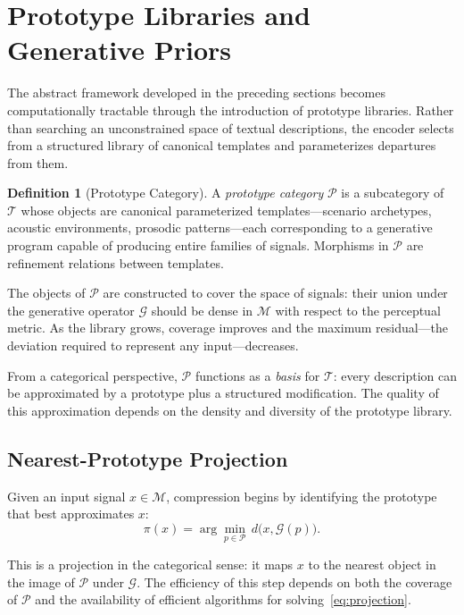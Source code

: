 \documentclass[12pt,a4paper]{article}
\theoremstyle{definition}
\newtheorem{definition}[theorem]{Definition}
\theoremstyle{remark}
\begin{document}
\section{Prototype Libraries and Generative Priors}
\label{sec:prototypes}

The abstract framework developed in the preceding sections becomes computationally tractable through the introduction of prototype libraries. Rather than searching an unconstrained space of textual descriptions, the encoder selects from a structured library of canonical templates and parameterizes departures from them.

\begin{definition}[Prototype Category]
A \emph{prototype category} $\mathcal{P}$ is a subcategory of $\mathcal{T}$ whose objects are canonical parameterized templates---scenario archetypes, acoustic environments, prosodic patterns---each corresponding to a generative program capable of producing entire families of signals. Morphisms in $\mathcal{P}$ are refinement relations between templates.
\end{definition}

The objects of $\mathcal{P}$ are constructed to cover the space of signals: their union under the generative operator $\mathcal{G}$ should be dense in $\mathcal{M}$ with respect to the perceptual metric. As the library grows, coverage improves and the maximum residual---the deviation required to represent any input---decreases.

From a categorical perspective, $\mathcal{P}$ functions as a \emph{basis} for $\mathcal{T}$: every description can be approximated by a prototype plus a structured modification. The quality of this approximation depends on the density and diversity of the prototype library.

\subsection{Nearest-Prototype Projection}

Given an input signal $x \in \mathcal{M}$, compression begins by identifying the prototype that best approximates $x$:
\begin{equation}
\pi(x) = \arg\min_{p \in \mathcal{P}} \, d\big(x, \mathcal{G}(p)\big).
\label{eq:projection}
\end{equation}

This is a projection in the categorical sense: it maps $x$ to the nearest object in the image of $\mathcal{P}$ under $\mathcal{G}$. The efficiency of this step depends on both the coverage of $\mathcal{P}$ and the availability of efficient algorithms for solving~\eqref{eq:projection}.
\end{document}
